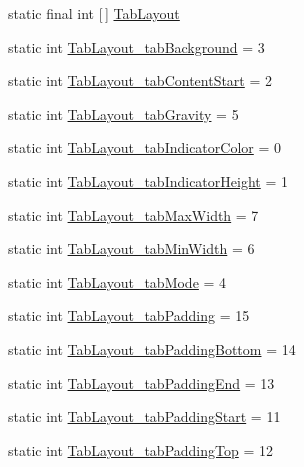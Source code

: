 \begin{DoxyCompactItemize}
\item 
static final int \mbox{[}$\,$\mbox{]} \hyperlink{classandroid_1_1support_1_1v4_1_1R_1_1styleable_a48e866d7121b40ef0bb3d467759606a9}{Tab\+Layout}
\item 
static int \hyperlink{classandroid_1_1support_1_1v4_1_1R_1_1styleable_aff73f001a86e4c7bd3a0406f04e2e608}{Tab\+Layout\+\_\+tab\+Background} = 3
\item 
static int \hyperlink{classandroid_1_1support_1_1v4_1_1R_1_1styleable_a423403a307833c0f1479f98d660ca905}{Tab\+Layout\+\_\+tab\+Content\+Start} = 2
\item 
static int \hyperlink{classandroid_1_1support_1_1v4_1_1R_1_1styleable_acebed0639553b18aced9e7b66e38ac1d}{Tab\+Layout\+\_\+tab\+Gravity} = 5
\item 
static int \hyperlink{classandroid_1_1support_1_1v4_1_1R_1_1styleable_ad73a1a29a20855a3bcc60d9bb7acd7b6}{Tab\+Layout\+\_\+tab\+Indicator\+Color} = 0
\item 
static int \hyperlink{classandroid_1_1support_1_1v4_1_1R_1_1styleable_a11f9245f1247673750bf79b31c3e1832}{Tab\+Layout\+\_\+tab\+Indicator\+Height} = 1
\item 
static int \hyperlink{classandroid_1_1support_1_1v4_1_1R_1_1styleable_af92579e4d7a148e6a6da15e69617009b}{Tab\+Layout\+\_\+tab\+Max\+Width} = 7
\item 
static int \hyperlink{classandroid_1_1support_1_1v4_1_1R_1_1styleable_aea0e67b08f61fea507155aa4237dcd59}{Tab\+Layout\+\_\+tab\+Min\+Width} = 6
\item 
static int \hyperlink{classandroid_1_1support_1_1v4_1_1R_1_1styleable_a7c5dda59a3cd0a09b99263ba97c5f0d0}{Tab\+Layout\+\_\+tab\+Mode} = 4
\item 
static int \hyperlink{classandroid_1_1support_1_1v4_1_1R_1_1styleable_ad20356f6d901f463b8d5baf3875311a0}{Tab\+Layout\+\_\+tab\+Padding} = 15
\item 
static int \hyperlink{classandroid_1_1support_1_1v4_1_1R_1_1styleable_a9cf94d20ae7b1d2855d68fb86f6d2af0}{Tab\+Layout\+\_\+tab\+Padding\+Bottom} = 14
\item 
static int \hyperlink{classandroid_1_1support_1_1v4_1_1R_1_1styleable_a89b79e5b865d6a39d504534559653673}{Tab\+Layout\+\_\+tab\+Padding\+End} = 13
\item 
static int \hyperlink{classandroid_1_1support_1_1v4_1_1R_1_1styleable_af995762d21ce21572c50a4d2905ccc22}{Tab\+Layout\+\_\+tab\+Padding\+Start} = 11
\item 
static int \hyperlink{classandroid_1_1support_1_1v4_1_1R_1_1styleable_a5eb6cfc8bb3bdd5e021b1b208a6e4eca}{Tab\+Layout\+\_\+tab\+Padding\+Top} = 12

\end{DoxyCompactItemize}
